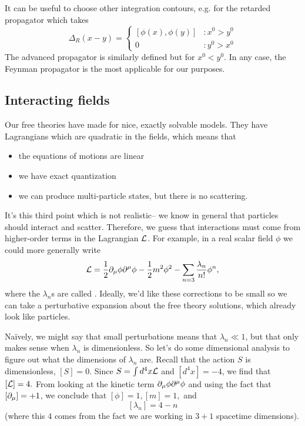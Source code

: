 It can be useful to choose other integration contours, e.g. for the retarded propagator which takes
$$\Delta_R(x-y)=\begin{cases}
[\phi(x),\phi(y)] &: x^0>y^0\\
0 &: y^0 > x^0
\end{cases}$$
The advanced propagator is similarly defined but for $x^0<y^0$. In any case, the Feynman propagator is the most applicable for our purposes.

\subsection*{Interacting fields} Our free theories have made for nice, exactly solvable models. They have Lagrangians which are quadratic in the fields, which means that
\begin{itemize}
    \item the equations of motions are linear
    \item we have exact quantization
    \item we can produce multi-particle states, but there is no scattering.
\end{itemize}

It's this third point which is not realistic-- we know in general that particles should interact and scatter. Therefore, we guess that interactions must come from higher-order terms in the Lagrangian $\mathcal L$. For example, in a real scalar field $\phi$ we could more generally write
$$\mathcal L=\frac{1}{2}\partial_\mu \phi \partial^\mu \phi -\frac{1}{2}m^2 \phi^2 - \sum_{n=3} \frac{\lambda_n}{n!} \phi^n,$$ where the $\lambda_n$s are called . Ideally, we'd like these corrections to be small so we can take a perturbative expansion about the free theory solutions, which already look like particles.

Na\"ively, we might say that small perturbations means that $\lambda_n \ll 1$, but that only makes sense when $\lambda_n$ is dimensionless. So let's do some dimensional analysis to figure out what the dimensions of $\lambda_n$ are. Recall that the action $S$ is dimensionless, $[S]=0.$
Since $S=\int d^4 x \mathcal L$ and $[d^4x]=-4$, we find that $[\mathcal L]=4.$ From looking at the kinetic term $\partial_\mu \phi \partial^\mu \phi$ and using the fact that $[\partial_\mu]=+1$, we conclude that $[\phi]=1, [m]=1,$ and
$$[\lambda_n]=4-n$$ (where this $4$ comes from the fact we are working in $3+1$ spacetime dimensions).

